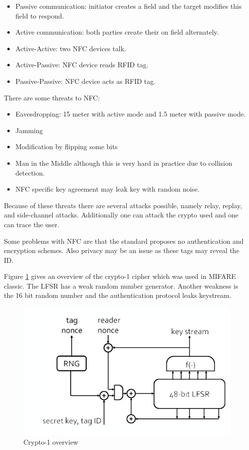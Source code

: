 \documentclass{article}
\begin{document}
\begin{itemize}
\item Passive communication: initiator creates a field and the target modifies this field to respond.
\item Active communication: both parties create their on field alternately.
\item Active-Active: two NFC devices talk.
\item Active-Passive: NFC device reads RFID tag.
\item Passive-Passive: NFC device acts as RFID tag.
\end{itemize}

\noindent There are some threats to NFC:

\begin{itemize}
\item Eavesdropping: 15 meter with active mode and 1.5 meter with passive mode.
\item Jamming
\item Modification by flipping some bits
\item Man in the Middle although this is very hard in practice due to collision detection.
\item NFC specific key agreement may leak key with random noise.
\end{itemize}

\noindent Because of these threats there are several attacks possible, namely relay, replay, and side-channel attacks. Additionally one can attack the crypto used and one can trace the user.

Some problems with NFC are that the standard proposes no authentication and encryption schemes. Also privacy may be an issue as these tags may reveal the ID.

Figure \ref{fig:crypto1overview} gives an overview of the crypto-1 cipher which was used in MIFARE classic. The LFSR has a weak random number generator. Another weakness is the 16 bit random number and the authentication protocol leaks keystream.

\begin{figure}[!h]
\centering
\includegraphics[width=\textwidth, height=\textheight, keepaspectratio]{images/crypto1overview.png}
\caption{Crypto-1 overview}
\label{fig:crypto1overview}
\end{figure}
\end{document}
